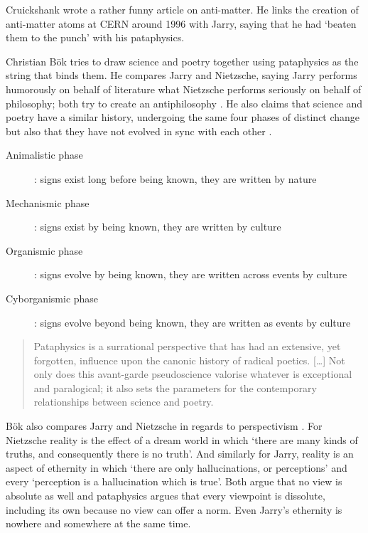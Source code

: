 Cruickshank \autocite{Cruickshank} wrote a rather funny article on anti-matter. He links the creation of anti-matter atoms at CERN around 1996 with Jarry, saying that he had `beaten them to the punch' with his pataphysics.

Christian Bök \autocite{Boek2002} tries to draw science and poetry together using pataphysics as the string that binds them. He compares Jarry and Nietzsche, saying Jarry performs humorously on behalf of literature what Nietzsche performs seriously on behalf of philosophy; both try to create an antiphilosophy \autocite[p.9]{Boek2002}. He also claims that science and poetry have a similar history, undergoing the same four phases of distinct change but also that they have not evolved in sync with each other \autocite[p.15]{Boek2002}.

\begin{description}
  \item [Animalistic phase]: signs exist long before being known, they are written by nature
  \item	[Mechanismic phase]: signs exist by being known, they are written by culture
  \item [Organismic phase]: signs evolve by being known, they are written across events by culture
  \item	[Cyborganismic phase]: signs evolve beyond being known, they are written as events by culture
\end{description}

\begin{quotation}
  Pataphysics is a surrational perspective that has had an extensive, yet forgotten, influence upon the canonic history of radical poetics. […] Not only does this avant-garde pseudoscience valorise whatever is exceptional and paralogical; it also sets the parameters for the contemporary relationships between science and poetry. 
\end{quotation}

Bök also compares Jarry and Nietzsche in regards to perspectivism \autocite[p.31]{Boek2002}. For Nietzsche reality is the effect of a dream world in which `there are many kinds of truths, and consequently there is no truth'. And similarly for Jarry, reality is an aspect of ethernity in which `there are only hallucinations, or perceptions' and every `perception is a hallucination which is true'. Both argue that no view is absolute as well and pataphysics argues that every viewpoint is dissolute, including its own because no view can offer a norm. Even Jarry's ethernity is nowhere and somewhere at the same time.

